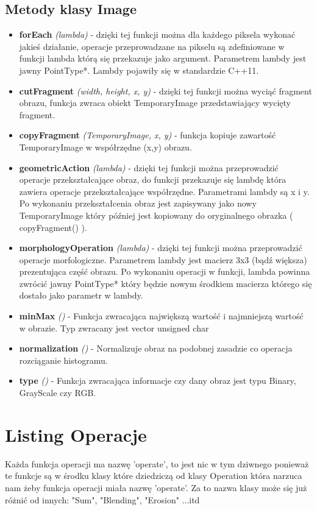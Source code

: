 \documentclass{article}
\begin{document}
\subsection{Metody klasy Image}
\begin{itemize}
\item {\bfseries forEach} {\itshape (lambda)} - dzięki tej funkcji można dla każdego piksela wykonać jakieś działanie, operacje przeprowadzane na pikselu są zdefiniowane w funkcji lambda którą się przekazuje jako argument. Parametrem lambdy jest jawny PointType*. Lambdy pojawiły się w standardzie C++11.
\item {\bfseries cutFragment} {\itshape (width, height, x, y)} - dzięki tej funkcji można wyciąć fragment obrazu, funkcja zwraca obiekt TemporaryImage przedstawiający wycięty fragment.
\item {\bfseries copyFragment} {\itshape (TemporaryImage, x, y)} - funkcja kopiuje zawartość TemporaryImage w współrzędne (x,y) obrazu.
\item {\bfseries geometricAction} {\itshape (lambda)} - dzięki tej funkcji można przeprowadzić operacje przekształcające obraz, do funkcji przekazuje się lambdę która zawiera operacje przekształcające współrzędne. Parametrami lambdy są x i y. Po wykonaniu przekształcenia obraz jest zapisywany jako nowy TemporaryImage który później jest kopiowany do oryginalnego obrazka ( copyFragment() ).
\item {\bfseries morphologyOperation} {\itshape (lambda)} - dzięki tej funkcji można przeprowadzić operacje morfologiczne. Parametrem lambdy jest macierz 3x3 (bądź większa) prezentująca część obrazu. Po wykonaniu operacji w funkcji, lambda powinna zwrócić jawny PointType* który będzie nowym środkiem macierza którego się dostało jako parametr w lambdy.

\item {\bfseries minMax} {\itshape ()} - Funkcja zwracająca największą wartość i najmniejszą wartość w obrazie. Typ zwracany jest vector unsigned char
\item {\bfseries normalization} {\itshape ()} - Normalizuje obraz na podobnej zasadzie co operacja rozciąganie histogramu.
\item {\bfseries type} {\itshape ()} - Funkcja zwracająca informacje czy dany obraz jest typu Binary, GrayScale czy RGB.
\end{itemize}
\FloatBarrier
\section{Listing Operacje}
Każda funkcja operacji ma nazwę 'operate', to jest nic w tym dziwnego ponieważ te funkcje są w środku klasy które dziedziczą od klasy Operation która narzuca nam żeby funkcja operacji miała nazwę 'operate'. Za to nazwa klasy może się już różnić od innych: "Sum", "Blending", "Erosion" ...itd
\FloatBarrier
\end{document}
